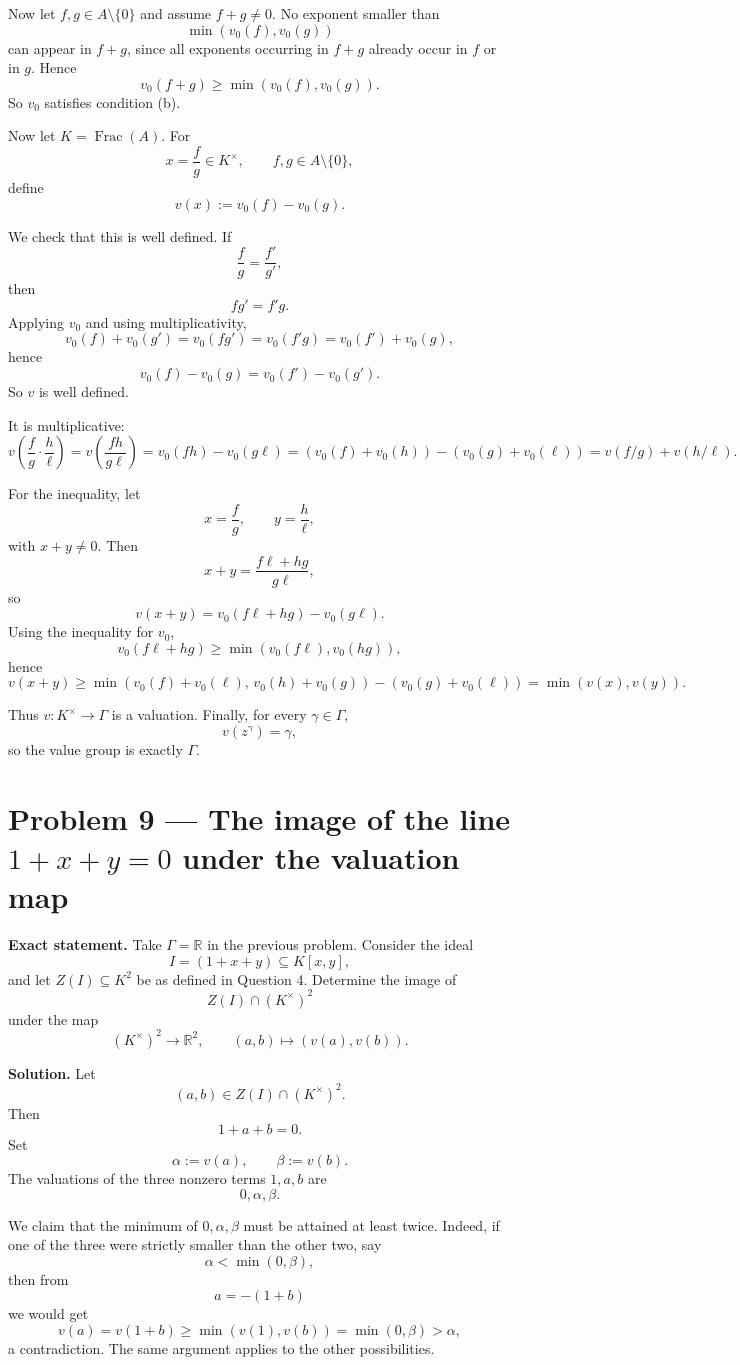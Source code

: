 \documentclass[12pt,a4paper,oneside]{report}
\theoremstyle{notespace}
\begin{document}
Now let \(f,g\in A\setminus\{0\}\) and assume \(f+g\neq 0\). No exponent smaller than
\[
\min(v_0(f),v_0(g))
\]
can appear in \(f+g\), since all exponents occurring in \(f+g\) already occur in \(f\) or in \(g\). Hence
\[
v_0(f+g)\ge \min(v_0(f),v_0(g)).
\]
So \(v_0\) satisfies condition (b).

Now let \(K=\operatorname{Frac}(A)\). For
\[
x=\frac{f}{g}\in K^\times,\qquad f,g\in A\setminus\{0\},
\]
define
\[
v(x):=v_0(f)-v_0(g).
\]

We check that this is well defined. If
\[
\frac{f}{g}=\frac{f'}{g'},
\]
then
\[
fg'=f'g.
\]
Applying \(v_0\) and using multiplicativity,
\[
v_0(f)+v_0(g')=v_0(fg')=v_0(f'g)=v_0(f')+v_0(g),
\]
hence
\[
v_0(f)-v_0(g)=v_0(f')-v_0(g').
\]
So \(v\) is well defined.

It is multiplicative:
\[
v\!\left(\frac{f}{g}\cdot\frac{h}{\ell}\right)
=v\!\left(\frac{fh}{g\ell}\right)
=v_0(fh)-v_0(g\ell)
=(v_0(f)+v_0(h))-(v_0(g)+v_0(\ell))
=v(f/g)+v(h/\ell).
\]

For the inequality, let
\[
x=\frac{f}{g},\qquad y=\frac{h}{\ell},
\]
with \(x+y\neq 0\). Then
\[
x+y=\frac{f\ell+hg}{g\ell},
\]
so
\[
v(x+y)=v_0(f\ell+hg)-v_0(g\ell).
\]
Using the inequality for \(v_0\),
\[
v_0(f\ell+hg)\ge \min(v_0(f\ell),v_0(hg)),
\]
hence
\[
v(x+y)\ge \min(v_0(f)+v_0(\ell),\,v_0(h)+v_0(g))-(v_0(g)+v_0(\ell))
=\min(v(x),v(y)).
\]

Thus \(v:K^\times\to \Gamma\) is a valuation. Finally, for every \(\gamma\in\Gamma\),
\[
v(z^\gamma)=\gamma,
\]
so the value group is exactly \(\Gamma\).

\bigskip

\section{Problem 9 --- The image of the line \texorpdfstring{$1+x+y=0$}{1+x+y=0} under the valuation map}

\textbf{Exact statement.}
Take \(\Gamma=\mathbb R\) in the previous problem. Consider the ideal
\[
I=(1+x+y)\subseteq K[x,y],
\]
and let \(Z(I)\subseteq K^2\) be as defined in Question 4. Determine the image of
\[
Z(I)\cap (K^\times)^2
\]
under the map
\[
(K^\times)^2\to \mathbb R^2,\qquad (a,b)\mapsto (v(a),v(b)).
\]

\textbf{Solution.}
Let
\[
(a,b)\in Z(I)\cap (K^\times)^2.
\]
Then
\[
1+a+b=0.
\]
Set
\[
\alpha:=v(a),\qquad \beta:=v(b).
\]
The valuations of the three nonzero terms \(1,a,b\) are
\[
0,\alpha,\beta.
\]

We claim that the minimum of \(0,\alpha,\beta\) must be attained at least twice. Indeed, if one of the three were strictly smaller than the other two, say
\[
\alpha<\min(0,\beta),
\]
then from
\[
a=-(1+b)
\]
we would get
\[
v(a)=v(1+b)\ge \min(v(1),v(b))=\min(0,\beta)>\alpha,
\]
a contradiction. The same argument applies to the other possibilities.
\end{document}

